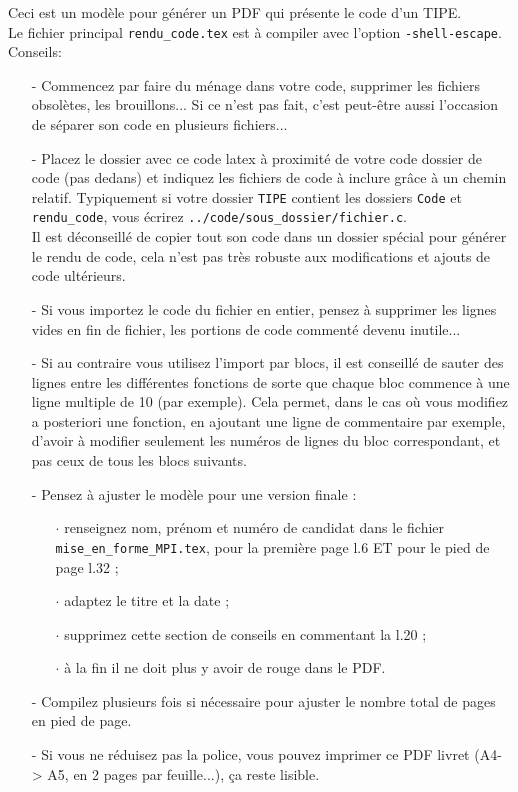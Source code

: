 \vspace*{0.4cm}
\noindent
Ceci est un modèle pour générer un PDF qui présente le code d'un TIPE.\\
Le fichier principal \texttt{rendu\_code.tex} est à compiler avec l'option \texttt{-shell-escape}.\\

\noindent
Conseils: 
\begin{itemize}
	\item[-] Commencez par faire du ménage dans votre code, supprimer les fichiers obsolètes, les brouillons... Si ce n'est pas fait, c'est peut-être aussi l'occasion de séparer son code en plusieurs fichiers...
	\\
	\item[-] Placez le dossier avec ce code latex à proximité de votre code dossier de code (pas dedans) et indiquez les fichiers de code à inclure grâce à un chemin relatif.
	Typiquement si votre dossier \texttt{TIPE} contient les dossiers \texttt{Code} et  \texttt{rendu\_code}, vous écrirez \texttt{../code/sous\_dossier/fichier.c}.\\
	Il est déconseillé de copier tout son code dans un dossier spécial pour générer le rendu de code, cela n'est pas très robuste aux modifications et ajouts de code ultérieurs.
	\\
	\item[-] 	Si vous importez le code du fichier en entier, pensez à supprimer les lignes vides en fin de fichier, les portions de code commenté devenu inutile...
	\\
	\item[-] 	Si au contraire vous utilisez l'import par blocs, il est conseillé de sauter des lignes entre les différentes fonctions de sorte que chaque bloc commence à une ligne multiple de 10 (par exemple).
	Cela permet, dans le cas où vous modifiez a posteriori une fonction, en ajoutant une ligne de commentaire par exemple, d'avoir à modifier seulement les numéros de lignes du bloc correspondant, et pas ceux de tous les blocs suivants.\\
	\item[-] Pensez à ajuster le modèle pour une version finale :
	\begin{itemize}
	\item[$\cdot$] renseignez nom, prénom et numéro de candidat dans le fichier \texttt{mise\_en\_forme\_MPI.tex}, pour la première page l.6 ET pour le pied de page l.32 ;
	\item[$\cdot$] adaptez le titre et la date ;
	\item[$\cdot$] supprimez cette section de conseils en commentant la l.20 ;
	\item[$\cdot$] à la fin il ne doit plus y avoir de rouge dans le PDF.\\
	\end{itemize}
	\item[-] Compilez plusieurs fois si nécessaire pour ajuster le nombre total de pages en pied de page.
	\\
	\item[-] Si vous ne réduisez pas la police, vous pouvez imprimer ce PDF livret (A4-> A5, en 2 pages par feuille...), ça reste lisible.
\end{itemize}
